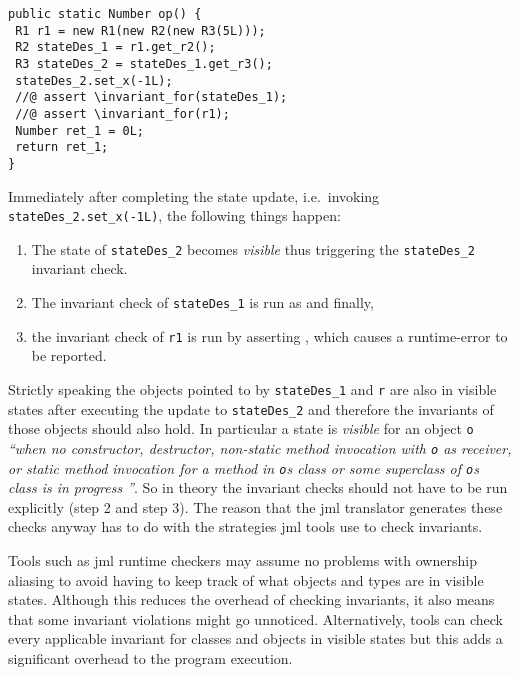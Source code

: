 \begin{lstlisting}[style=customJml,caption={Code-generated version of
the operation from
\autoref{lst:vdmRecNesting}.},label={lst:jmlRecNesting}]
public static Number op() {
 R1 r1 = new R1(new R2(new R3(5L)));
 R2 stateDes_1 = r1.get_r2();
 R3 stateDes_2 = stateDes_1.get_r3();
 stateDes_2.set_x(-1L);
 //@ assert \invariant_for(stateDes_1);
 //@ assert \invariant_for(r1);
 Number ret_1 = 0L;
 return ret_1;
}
\end{lstlisting}

Immediately after completing the state update, i.e.\ invoking
\texttt{stateDes\_2.set\_x(-1L)}, the following things happen:

\begin{enumerate}

\item The state of \texttt{stateDes\_2} becomes \emph{visible} thus
  triggering the \texttt{stateDes\_2} invariant check.

\item The invariant check of \texttt{stateDes\_1} is run as
   and finally,

\item the invariant check of \texttt{r1} is run by asserting ,
  which causes a runtime-error to be reported.
\end{enumerate}

Strictly speaking the objects pointed to by \texttt{stateDes\_1} and
\texttt{r} are also in visible states after executing the update to
\texttt{stateDes\_2} and therefore the invariants of those objects
should also hold. In particular a state is \emph{visible} for an
object \texttt{o} \textit{``when no constructor, destructor,
  non-static method invocation with \texttt{o} as receiver, or static
  method invocation for a method in \texttt{o}\textquotesingle s class
  or some superclass of \texttt{o}\textquotesingle s class is in
  progress \cite{Leavens&13}''}. So in theory the invariant checks
should not have to be run explicitly (step 2 and step 3). The reason
that the \ac{jml} translator generates these checks anyway has to do
with the strategies \ac{jml} tools use to check invariants.

Tools such as \ac{jml} runtime checkers may assume no problems with
ownership aliasing to avoid having to keep track of what objects and
types are in visible states. Although this reduces the overhead of
checking invariants, it also means that some invariant violations might
go unnoticed. Alternatively, tools can check every applicable
invariant for classes and objects in visible states but this adds a
significant overhead to the program execution.

